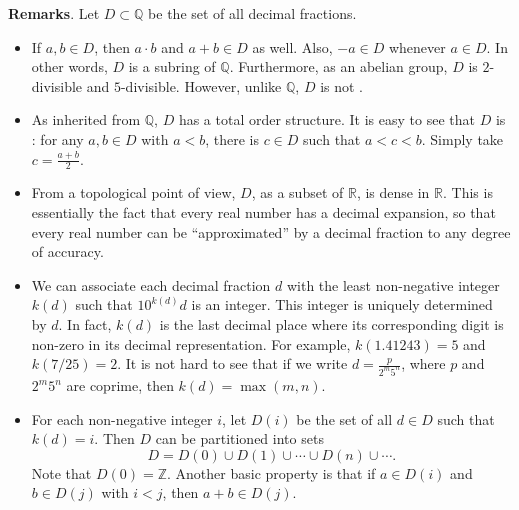 \documentclass[12pt]{article}
\begin{document}
\textbf{Remarks}.  Let $D\subset \mathbb{Q}$ be the set of all decimal fractions.
\begin{itemize}
\item
If $a,b \in D$, then $a\cdot b$ and $a+b\in D$ as well.  Also, $-a \in D$ whenever $a\in D$.  In other words, $D$ is a subring of $\mathbb{Q}$.  Furthermore, as an abelian group, $D$ is $2$-divisible and $5$-divisible.  However, unlike $\mathbb{Q}$, $D$ is not .
\item
As inherited from $\mathbb{Q}$, $D$ has a total order structure.  It is easy to see that $D$ is : for any $a,b\in D$ with $a< b$, there is $c\in D$ such that $a<c<b$.  Simply take $c=\displaystyle{\frac{a+b}{2}}$.
\item
From a topological point of view, $D$, as a subset of $\mathbb{R}$, is dense in $\mathbb{R}$.  This is essentially the fact that every real number has a decimal expansion, so that every real number can be ``approximated'' by a decimal fraction to any degree of accuracy.
\item
We can associate each decimal fraction $d$ with the least non-negative integer $k(d)$ such that $10^{k(d)}d$ is an integer.  This integer is uniquely determined by $d$.  In fact, $k(d)$ is the last decimal place where its corresponding digit is non-zero in its decimal representation.  For example, $k(1.41243)=5$ and $k(7/25)=2$.  It is not hard to see that if we write $d=\displaystyle{\frac{p}{2^m5^n}}$, where $p$ and $2^m5^n$ are coprime, then $k(d)=\max(m,n)$.
\item
For each non-negative integer $i$, let $D(i)$ be the set of all $d\in D$ such that $k(d)=i$.  Then $D$ can be partitioned into sets $$D=D(0)\cup D(1) \cup \cdots \cup D(n) \cup \cdots.$$  Note that $D(0)=\mathbb{Z}$.  Another basic property is that if $a\in D(i)$ and $b\in D(j)$ with $i<j$, then $a+b\in D(j)$.
\end{itemize}
\end{document}
